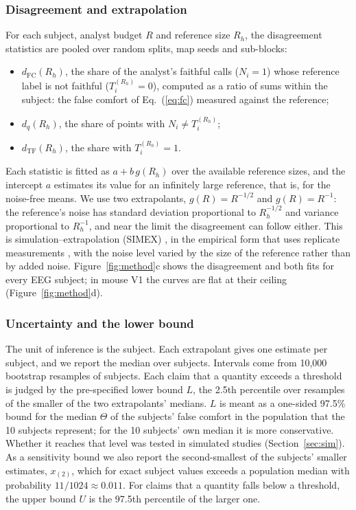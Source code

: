 \documentclass[11pt]{article}
\newcommand{\FC}{\mathrm{FC}}
\begin{document}
\subsubsection{Disagreement and extrapolation}\label{sec:extrap}
For each subject, analyst budget $R$ and reference size $R_h$, the disagreement statistics are pooled over random splits, map seeds and sub-blocks:
\begin{itemize}[leftmargin=*]
  \item $d_{\FC}(R_h)$, the share of the analyst's faithful calls ($N_i=1$) whose reference label is not faithful ($T^{(R_h)}_i=0$), computed as a ratio of sums within the subject: the false comfort of Eq.~(\ref{eq:fc}) measured against the reference;
  \item $d_q(R_h)$, the share of points with $N_i\neq T^{(R_h)}_i$;
  \item $d_{\mathrm{TF}}(R_h)$, the share with $T^{(R_h)}_i=1$.
\end{itemize}
Each statistic is fitted as $a+b\,g(R_h)$ over the available reference sizes, and the intercept $a$ estimates its value for an infinitely large reference, that is, for the noise-free means.
We use two extrapolants, $g(R)=R^{-1/2}$ and $g(R)=R^{-1}$: the reference's noise has standard deviation proportional to $R_h^{-1/2}$ and variance proportional to $R_h^{-1}$, and near the limit the disagreement can follow either.
This is simulation--extrapolation (SIMEX) \citep{cook1994}, in the empirical form that uses replicate measurements \citep{devanarayan2002}, with the noise level varied by the size of the reference rather than by added noise.
Figure~\ref{fig:method}c shows the disagreement and both fits for every EEG subject; in mouse V1 the curves are flat at their ceiling (Figure~\ref{fig:method}d).

\subsubsection{Uncertainty and the lower bound}\label{sec:bounds}
The unit of inference is the subject.
Each extrapolant gives one estimate per subject, and we report the median over subjects.
Intervals come from 10{,}000 bootstrap resamples of subjects.
Each claim that a quantity exceeds a threshold is judged by the pre-specified lower bound $L$, the 2.5th percentile over resamples of the smaller of the two extrapolants' medians.
$L$ is meant as a one-sided 97.5\% bound for the median $\Theta$ of the subjects' false comfort in the population that the 10 subjects represent; for the 10 subjects' own median it is more conservative.
Whether it reaches that level was tested in simulated studies (Section~\ref{sec:sim}).
As a sensitivity bound we also report the second-smallest of the subjects' smaller estimates, $x_{(2)}$, which for exact subject values exceeds a population median with probability $11/1024\approx0.011$.
For claims that a quantity falls below a threshold, the upper bound $U$ is the 97.5th percentile of the larger one.
\end{document}

